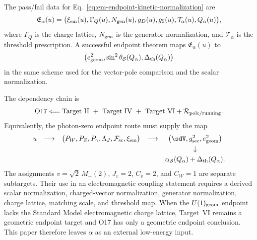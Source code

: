 The pass/fail data for Eq.~\eqref{eq:em-endpoint-kinetic-normalization} are
\[
\mathfrak E_\alpha(u)
=
\big(
\xi_{\rm em}(u),\Gamma_Q(u),N_{\rm gen}(u),g_D(u),
g_5(u),\mathcal T_\alpha(u),Q_\alpha(u)
\big),
\]
where \(\Gamma_Q\) is the charge lattice, \(N_{\rm gen}\) is the generator
normalization, and \(\mathcal T_\alpha\) is the threshold prescription.  A
successful endpoint theorem maps \(\mathfrak E_\alpha(u)\) to
\[
\big(e_{\rm geom}^2,\sin^2\theta_{\mathcal S}(Q_\alpha),
\Delta_{\rm th}(Q_\alpha)\big)
\]
in the same scheme used for the vector-pole comparison and the scalar
normalization.

The dependency chain is
\begin{equation}
  {\rm O17}
  \Longleftarrow
  {\rm Target~II}\ +\ {\rm Target~IV}\ +\ {\rm Target~VI}
  +\mathcal R_{\rm pole/running}.
  \label{eq:o17-dependency-chain}
\end{equation}
Equivalently, the photon-zero endpoint route must supply the map
\begin{equation}
\begin{array}{ccccc}
u
&\longrightarrow&
\big(P_W,P_Z,P_\gamma,\Lambda_J,\mathcal F_{\rm sc},\xi_{\rm em}\big)
&\longrightarrow&
\big(\sdV,g_{\rm sec}^2,e_{\rm geom}^2\big)
\\[3pt]
&&&&\downarrow
\\[3pt]
&&&&
\alpha_{\mathcal S}(Q_\alpha)+\Delta_{\rm th}(Q_\alpha).
\end{array}
\label{eq:o17-photon-zero-diagram}
\end{equation}
The assignments \(v=\sqrt2\,M_-(2)\), \(J_v=2\), \(C_v=2\), and \(C_W=1\)
are separate subtargets.  Their use in an electromagnetic coupling statement
requires a derived scalar normalization, charged-vector normalization,
generator normalization, charge lattice, matching scale, and threshold map.
When the \(U(1)_{\rm geom}\) endpoint lacks the Standard Model electromagnetic
charge lattice, Target~VI remains a geometric endpoint target and O17 has only
a geometric endpoint conclusion.  This paper therefore leaves
\(\alpha\) as an external low-energy input.

